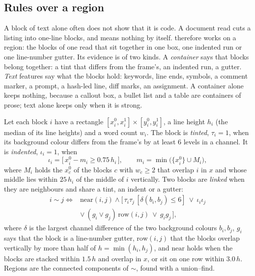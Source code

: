 \subsection{Rules over a region}\label{sec:region}

A block of text alone often does not show that it is code. A document read cuts a listing into one-line blocks, and
 means nothing by itself.  therefore works on a region: the blocks of one read that sit together in
one box, one indented run or one line-number gutter. Its evidence is of two kinds. A \emph{container} says that blocks belong
together: a tint that differs from the frame's, an indented run, a gutter. \emph{Text} features say what the blocks hold:
keywords, line ends, symbols, a comment marker, a prompt, a hash-led line, diff marks, an assignment. A container alone keeps
nothing, because a callout box, a bullet list and a table are containers of prose; text alone keeps only when it is strong.

Let each block $i$ have a rectangle $[x^0_i,x^1_i]\times[y^0_i,y^1_i]$, a line height $h_i$ (the median of its line heights) and a
word count $w_i$. The block is \emph{tinted}, $\tau_i=1$, when its background colour differs from the frame's by at least $6$
levels in a channel. It is \emph{indented}, $\iota_i=1$, when
\begin{equation}\label{eq:indent}
\iota_i=\bigl[\,x^0_i-m_i\ge0.75\,h_i\,\bigr],\qquad m_i=\min\bigl(\{x^0_i\}\cup M_i\bigr),
\end{equation}
where $M_i$ holds the $x^0_c$ of the blocks $c$ with $w_c\ge2$ that overlap $i$ in $x$ and whose middle lies within $25\,h_i$ of the middle of $i$ vertically.
Two blocks are \emph{linked} when they are neighbours and share a tint, an indent or a gutter:
\begin{equation}\label{eq:link}
\begin{aligned}
i\sim j\iff{}&\mathrm{near}(i,j)\land\bigl[\,\tau_i\tau_j\,[\delta(b_i,b_j)\le6]\ \lor\ \iota_i\iota_j\\
&\lor\ (g_i\lor g_j)\,\mathrm{row}(i,j)\ \lor\ g_ig_j\,\bigr],
\end{aligned}
\end{equation}
where $\delta$ is the largest channel difference of the two background colours $b_i,b_j$, $g_i$ says that the block is a
line-number gutter, $\mathrm{row}(i,j)$ that the blocks overlap vertically by more than half of $h=\min(h_i,h_j)$, and
$\mathrm{near}$ holds when the blocks are stacked within $1.5\,h$ and overlap in $x$, or sit on one row within $3.0\,h$.
Regions are the connected components of $\sim$, found with a union--find.

